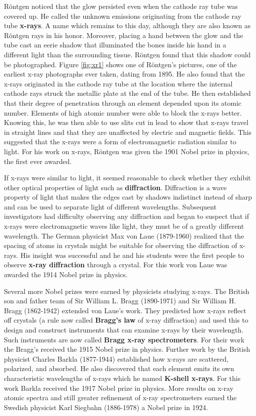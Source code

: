 R\"{o}ntgen noticed that the glow persisted even when the cathode ray tube was covered up. He called the unknown emissions originating from the cathode ray tube {\bf x-rays}. A name which remains to this day, although they are also known as R\"{o}ntgen rays in his honor. Moreover, placing a hand between the glow and the tube cast an eerie shadow that illuminated the bones inside his hand in a different light than the surrounding tissue. R\"{o}ntgen found that this shadow could be photographed. Figure \ref{fig:xr1} shows one of R\"{o}ntgen's pictures, one of the earliest x-ray photographs ever taken, dating from 1895. He also found that the x-rays originated in the cathode ray tube at the location where the internal cathode rays struck the metallic plate at the end of the tube. He then established that their degree of penetration through an element depended upon its atomic number. Elements of high atomic number were able to block the x-rays better. Knowing this, he was then able to use slits cut in lead to show that x-rays travel in straight lines and that they are unaffected by electric and magnetic fields. This suggested that the x-rays were a form of electromagnetic radiation similar to light. For his work on x-rays, R\"{o}ntgen was given the 1901 Nobel prize in physics, the first ever awarded.

If x-rays were similar to light, it seemed reasonable to check whether they exhibit other optical properties of light such as {\bf diffraction}. Diffraction is a wave property of light that makes the edges cast by shadows indistinct instead of sharp and can be used to separate light of different wavelengths. Subsequent investigators had difficulty observing any diffraction and began to suspect that if x-rays were electromagnetic waves like light, they must be of a greatly different wavelength. The German physicist Max von Laue (1879-1960) realized that the spacing of atoms in crystals might be suitable for observing the diffraction of x-rays. His insight was successful and he and his students were the first people to observe {\bf x-ray diffraction} through a crystal. For this work von Laue was awarded the 1914 Nobel prize in physics.

Several more Nobel prizes were earned by physicists studying x-rays. The British son and father team of Sir William L. Bragg (1890-1971) and Sir William H. Bragg (1862-1942) extended von Laue's work. They predicted how x-rays reflect off crystals (a rule now called {\bf Bragg's law} of x-ray diffraction) and used this to design and construct instruments that can examine x-rays by their wavelength. Such instruments are now called {\bf Bragg x-ray spectrometers}. For their work the Bragg's received the 1915 Nobel prize in physics. Further work by the British physicist Charles Barkla (1877-1944) established how x-rays are scattered, polarized, and absorbed. He also discovered that each element emits its own characteristic wavelengths of x-rays which he named {\bf K-shell x-rays}. For this work Barkla received the 1917 Nobel prize in physics. More results on x-ray atomic spectra and still greater refinement of x-ray spectrometers earned the Swedish physicist Karl Siegbahn (1886-1978) a Nobel prize in 1924.

